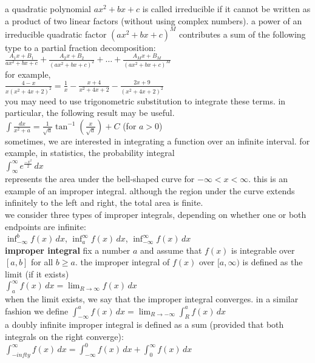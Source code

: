 \documentclass{article}
\begin{document}
a quadratic polynomial $ax^2 + bx + c$ is called irreducible if it cannot be written as a product of two linear factors (without using complex numbers). a power of an irreducible quadratic factor $(ax^2 + bx + c)^M$ contributes a sum of the following type to a partial fraction decomposition:\\
$\frac{A_1x + B_1}{ax^2 + bx + c} + \frac{A_2x + B_2}{(ax^2 + bx + c)^2} + \ldots + \frac{A_Mx + B_M}{(ax^2 + bx + c)^M}$\\
for example,\\
$\frac{4 - x}{x(x^2 + 4x + 2)^2} = \frac{1}{x} - \frac{x + 4}{x^2 + 4x + 2} - \frac{2x + 9}{(x^2 + 4x + 2)^2}$\\
you may need to use trigonometric substitution to integrate these terms. in particular, the following result may be useful.\\
$\int\frac{dx}{x^2 + a} = \frac{1}{\sqrt{a}}\tan^{-1}(\frac{x}{\sqrt{a}}) + C$ (for $a > 0$)\\

sometimes, we are interested in integrating a function over an infinite interval. for example, in statistics, the probability integral\\ $\int_{\infty}^{\infty}e^{\frac{-x^2}{2}}\,dx$\\ represents the area under the bell-shaped curve for $-\infty < x < \infty$. this is an example of an improper integral. although the region under the curve extends infinitely to the left and right, the total area is finite.\\ we consider three types of improper integrals, depending on whether one or both endpoints are infinite:\\ $\inf_{-\infty}^{b}f(x)\,dx$, $\inf_{a}^{\infty}f(x)\,dx$, $\inf_{-\infty}^{\infty}f(x)\,dx$\\

\textbf{improper integral} fix a number $a$ and assume that $f(x)$ is integrable over $[a, b]$ for all $b \geq a$. the improper integral of $f(x)$ over $[a, \infty)$ is defined as the limit (if it exists)\\
$\int_{a}^{\infty}f(x)\,dx = \lim_{R \to \infty}f(x)\,dx$\\
when the limit exists, we say that the improper integral converges. in a similar fashion we define $\int_{-\infty}^{a}f(x)\,dx = \lim_{R \to -\infty}\int_{R}^{a}f(x)\,dx$\\

a doubly infinite improper integral is defined as a sum (provided that both integrals on the right converge):\\
$\int_{-infty}^{\infty}f(x)\,dx = \int_{-\infty}^{0}f(x)\,dx + \int_{0}^{\infty}f(x)\,dx$
\end{document}
